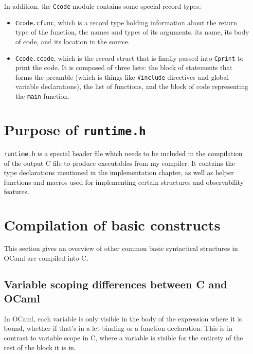 In addition, the \texttt{Ccode} module contains some special record types:

\begin{itemize}

\item \texttt{Ccode.cfunc}, which is a record type holding information about the
    return type of the function, the names and types of its arguments, its name,
    its body of code, and its location in the source.

\item \texttt{Ccode.ccode}, which is the record struct that is finally passed
    into \texttt{Cprint} to print the code. It is composed of three lists: the
    block of statements that forms the preamble (which is things like
    \texttt{\#}\texttt{include} directives and global variable declarations),
    the list of functions, and the block of code representing the \texttt{main}
    function.

\end{itemize}

\section{Purpose of \texttt{runtime.h}}

\texttt{runtime.h} is a special header file which needs to be included in the
compilation of the output C file to produce executables from my compiler. It
contains the type declarations mentioned in the implementation chapter, as well
as helper functions and macros used for implementing certain structures and
observability features.

\section{Compilation of basic constructs} \label{basic-constructs}

This section gives an overview of other common basic syntactical structures
in OCaml are compiled into C.

\subsection{Variable scoping differences between C and OCaml}
\label{variable-scoping}

In OCaml, each variable is only visible in the body of the expression where it
is bound, whether if that's in a let-binding or a function declaration. This is
in contrast to variable scope in C, where a variable is visible for the entirety
of the rest of the block it is in.

